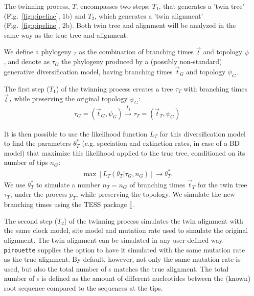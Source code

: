 The twinning process, $T$, encompasses two steps:
$T_1$, that generates a 'twin tree' (Fig.~\ref{fig:pipeline}, 1b) 
and $T_2$, which generates a 'twin alignment' (Fig.~\ref{fig:pipeline}, 2b).
Both twin tree and alignment will be analyzed in the same way 
as the true tree and alignment.

We define a phylogeny $\tau$ as the combination of
branching times $\Vec{t}$ and topology $\psi$, 
and denote as $\tau_{\mathit{G}}$ the phylogeny 
produced by a (possibly non-standard) generative diversification model, 
having branching times $\Vec{t}_{\mathit{G}}$ and 
topology $\psi_{\mathit{G}}$.

The first step ($T_1$) of the twinning process creates a tree $\tau_{\mathit{T}}$
with branching times $\Vec{t}_{\mathit{T}}$ while preserving the original
topology $\psi_{\mathit{G}}$:
\begin{align}
  \tau_{\mathit{G}} = (\Vec{t}_{\mathit{G}}, \psi_{\mathit{G}}) 
  \xrightarrow[]{\mathit{T_1}} 
  \tau_{\mathit{T}} = (\Vec{t}_{\mathit{T}}, \psi_{\mathit{G}})
\end{align}


It is then possible to use the likelihood function 
$L_{\mathit{T}}$ for this diversification model to find 
the parameters $\theta^{*}_{\mathit{T}}$ 
(e.g. speciation and extinction rates, in case of a BD model) 
that maximize this likelihood applied 
to the true tree, conditioned on its number of tips $n_{\mathit{G}}$:
\begin{align}
    \max[L_{\mathit{T}}(\theta_{\mathit{T}}|\tau_{\mathit{G}}, n_{\mathit{G}})] 
\rightarrow \theta^{*}_{\mathit{T}}.
\end{align}
We use $\theta^{*}_{\mathit{T}}$ to simulate a number 
$n_{\mathit{T}} = n_{\mathit{G}}$ 
of branching times $\Vec{t}_{\mathit{T}}$ for the twin tree 
$\tau_{\mathit{T}}$, under the process $p_{T}$, 
while preserving the topology. 
We simulate the new branching times using the TESS 
package [\cite{TESS, hohna2016tess}].

The second step ($T_2$) of the twinning process simulates the twin alignment 
with the same clock model, site model and mutation rate 
used to simulate the original alignment. 
The twin alignment can be simulated in any user-defined way.
\verb;pirouette; supplies the option to have it simulated with
the same mutation rate as the true alignment. By default, however,
not only the same mutation rate is used, but also the total number of s
matches the true alignment. The total number of s is defined
as the amount of different nucleotides between the (known) root sequence
compared to the sequences at the tips.

